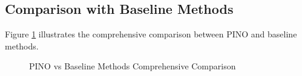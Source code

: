 \subsection{Comparison with Baseline Methods}

Figure \ref{fig:appendix_pino_comparison} illustrates the comprehensive comparison between PINO and baseline methods.

\begin{figure}[h]
\centering
\caption{PINO vs Baseline Methods Comprehensive Comparison}
\label{fig:appendix_pino_comparison}
\end{figure}
